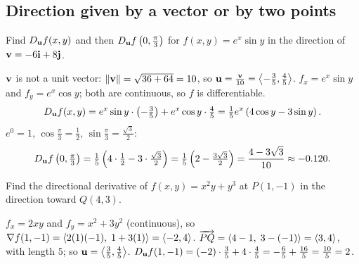 \subsection{Direction given by a vector or by two points}

\begin{problem}\label{prob:p6}
Find $D_{\mathbf{u}} f(x,y)$ and then $D_{\mathbf{u}} f\left(0,\frac\pi3\right)$ for
$f(x,y)=e^x\sin y$ in the direction of $\mathbf{v}=-6\mathbf{i}+8\mathbf{j}$.
\end{problem}
\begin{solution}
 $\mathbf{v}$ is not a unit vector: $\lVert\mathbf{v}\rVert=\sqrt{36+64}=10$, so
$\mathbf{u}=\frac{\mathbf{v}}{10}=\left\langle -\frac35,\frac45 \right\rangle$.
 $f_x=e^x\sin y$ and $f_y=e^x\cos y$; both are continuous, so $f$ is
differentiable.
\[
  D_{\mathbf{u}} f(x,y)=e^x\sin y\cdot\left(-\tfrac35\right)+e^x\cos y\cdot\tfrac45=\tfrac15e^x\left(4\cos y-3\sin y\right).
\]
 $e^0=1$, $\cos\frac\pi3=\frac12$, $\sin\frac\pi3=\frac{\sqrt3}{2}$:
\[
  D_{\mathbf{u}} f\left(0,\tfrac\pi3\right)=\tfrac15\left(4\cdot\tfrac12-3\cdot\tfrac{\sqrt3}{2}\right)=\tfrac15\left(2-\tfrac{3\sqrt3}{2}\right)=\frac{4-3\sqrt3}{10}\approx-0.120 .
\]
\end{solution}

\begin{problem}\label{prob:p7}
Find the directional derivative of $f(x,y)=x^2y+y^3$ at $P(1,-1)$ in the
direction toward $Q(4,3)$.
\end{problem}
\begin{solution}
 $f_x=2xy$ and $f_y=x^2+3y^2$ (continuous), so
$\nabla f(1,-1)=\left\langle 2(1)(-1),\;1+3(1) \right\rangle=\left\langle -2,4 \right\rangle$.
 $\overrightarrow{PQ}=\left\langle 4-1,\;3-(-1) \right\rangle=\left\langle 3,4 \right\rangle$, with length $5$; so $\mathbf{u}=\left\langle \frac35,\frac45 \right\rangle$.
 $D_{\mathbf{u}} f(1,-1)=(-2)\cdot\frac35+4\cdot\frac45=-\frac65+\frac{16}{5}=\frac{10}{5}=2$.
\end{solution}

